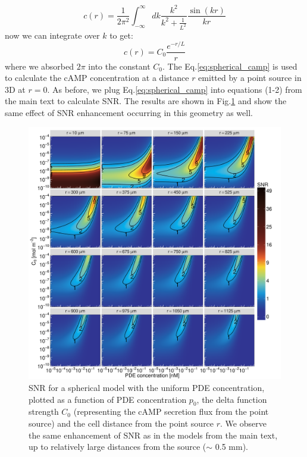 \documentclass[10pt]{article}
\begin{document}
\begin{equation}
	c(r) = \frac{1}{2\pi^2} \int_{-\infty}^{\infty} dk \frac{k^2}{k^2 + \frac{1}{L^2}} \frac{\sin(kr)}{kr}
\end{equation}
now we can integrate over $k$ \cite{wolfram} to get:
\begin{equation}
	c(r) = C_0 \frac{e^{-r/L}}{r}
	\label{eq:spherical_camp}
\end{equation}
where we absorbed $2\pi$ into the constant $C_0$. The Eq.\ref{eq:spherical_camp} is used to calculate the cAMP concentration at a distance $r$ emitted by a point source in 3D at $r = 0$. As before, we plug Eq.\ref{eq:spherical_camp} into equations (1-2) from the main text to calculate SNR. The results are shown in Fig.\ref{fig:snr_spherical_results} and show the same effect of SNR enhancement occurring in this geometry as well.

\begin{figure}
	\centering
	\includegraphics[scale=0.35]{../figures/si_pde_uniform_spherical_model_snr}
	\caption{SNR for a spherical model with the uniform PDE concentration, plotted as a function of PDE concentration $p_0$, the delta function strength $C_0$ (representing the cAMP secretion flux from the point source) and the cell distance from the point source $r$. We observe the same enhancement of SNR as in the models from the main text, up to relatively large distances from the source ($\sim$ 0.5 mm). }
	\label{fig:snr_spherical_results}
\end{figure}
\end{document}

